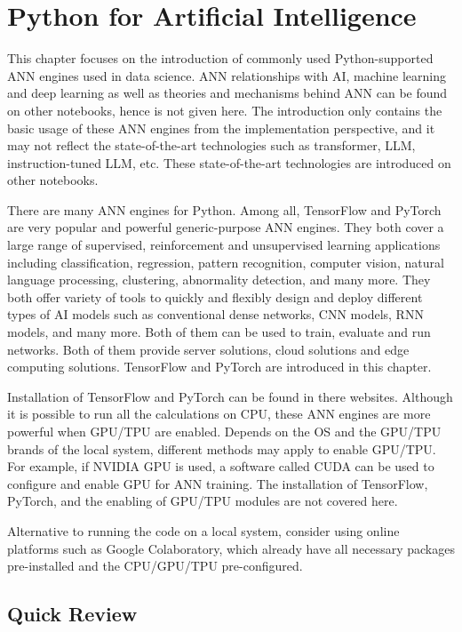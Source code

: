 \chapter{Python for Artificial Intelligence} \label{ch:tftorch}

This chapter focuses on the introduction of commonly used Python-supported ANN engines used in data science. ANN relationships with AI, machine learning and deep learning as well as theories and mechanisms behind ANN can be found on other notebooks, hence is not given here. The introduction only contains the basic usage of these ANN engines from the implementation perspective, and it may not reflect the state-of-the-art technologies such as transformer, LLM, instruction-tuned LLM, etc. These state-of-the-art technologies are introduced on other notebooks.

There are many ANN engines for Python. Among all, TensorFlow and PyTorch are very popular and powerful generic-purpose ANN engines. They both cover a large range of supervised, reinforcement and unsupervised learning applications including classification, regression, pattern recognition, computer vision, natural language processing, clustering, abnormality detection, and many more. They both offer variety of tools to quickly and flexibly design and deploy different types of AI models such as conventional dense networks, CNN models, RNN models, and many more. Both of them can be used to train, evaluate and run networks. Both of them provide server solutions, cloud solutions and edge computing solutions.  TensorFlow and PyTorch are introduced in this chapter.

Installation of TensorFlow and PyTorch can be found in there websites. Although it is possible to run all the calculations on CPU, these ANN engines are more powerful when GPU/TPU are enabled. Depends on the OS and the GPU/TPU brands of the local system, different methods may apply to enable GPU/TPU. For example, if NVIDIA GPU is used, a software called CUDA can be used to configure and enable GPU for ANN training. The installation of TensorFlow, PyTorch, and the enabling of GPU/TPU modules are not covered here.

Alternative to running the code on a local system, consider using online platforms such as Google Colaboratory, which already have all necessary packages pre-installed and the CPU/GPU/TPU pre-configured.

\section{Quick Review}

